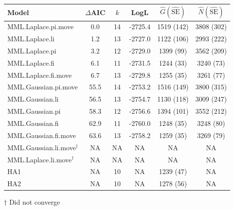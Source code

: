 \documentclass[12pt,fleqn]{article}
\begin{document}
\begin{table}[ht]
\caption{
}
\label{tab:ests}
\raggedright
\begin{tabular}{lccccc}
  \hline
  Model & $\Delta$AIC & $k$ & LogL & $\hat{G}(\hat{\textrm{SE}})$ & $\hat{N}(\hat{\textrm{SE}})$  \\
  \hline
  MML.Laplace.pi.move & 0.0 & 14 & -2725.4 & 1519 (142) & 3808 (302) \\
  MML.Laplace.li & 1.2 & 13 & -2727.0 & 1122 (106) & 2993 (222) \\
  MML.Laplace.pi & 3.2 & 12 & -2729.0 & 1399 (99) & 3562 (209) \\
  MML.Laplace.fi & 6.1 & 11 & -2731.5 & 1244 (33) & 3240 (73) \\
  MML.Laplace.fi.move & 6.7 & 13 & -2729.8 & 1255 (35) & 3261 (77) \\
  MML.Gaussian.pi.move & 55.5 & 14 & -2753.2 & 1516 (149) & 3800 (315) \\
  MML.Gaussian.li & 56.5 & 13 & -2754.7 & 1130 (118) & 3009 (247) \\
  MML.Gaussian.pi & 58.3 & 12 & -2756.6 & 1394 (101) & 3552 (212) \\
  MML.Gaussian.fi & 62.9 & 11 & -2760.0 & 1248 (35) & 3248 (80) \\
  MML.Gaussian.fi.move & 63.6 & 13 & -2758.2 & 1259 (35) & 3269 (79) \\
  MML.Gaussian.li.move$^\dag$ & NA & NA & NA & NA & NA \\
  MML.Laplace.li.move$^\dag$ & NA & NA & NA & NA & NA \\
  HA1 & NA & 10 & NA & 1239 (47) & NA \\
  HA2 & NA & 10 & NA & 1278 (56) & NA \\
\hline
\end{tabular}
$\dag$ Did not converge
\end{table}

\pagebreak
\end{document}
